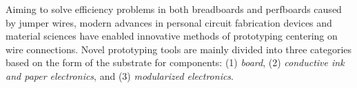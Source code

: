 

Aiming to solve efficiency problems in both breadboards and perfboards caused by jumper wires,
modern advances in personal circuit fabrication devices and material sciences have enabled innovative methods of prototyping centering on wire connections. Novel prototyping tools are mainly divided into three categories based on the form of the substrate for components: (1) \textit{board}, (2) \textit{conductive ink and paper electronics}, and (3) \textit{modularized electronics}.



